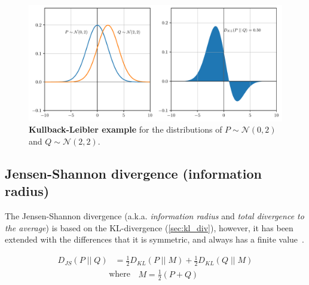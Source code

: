 \begin{figure}[!htp]
    \centering
    \includegraphics[width=0.9\linewidth]{graphics/kullback-leibler.pdf}
    \caption{\textbf{Kullback-Leibler example} for the distributions of
    $P\sim{}\mathcal{N}(0,2)$ and $Q\sim{}\mathcal{N}(2,2)$. }
    \label{fig:kullback-leibler}
\end{figure}

\subsection{Jensen-Shannon divergence (information radius)}

The Jensen-Shannon divergence (a.k.a. \textit{information radius} and
\textit{total divergence to the average}) is based on the KL-divergence
(\autoref{sec:kl_div}), however, it has been extended with the differences that
it is symmetric, and always has a finite value~\cite{Endres2003, Fuglede2004}.


\begin{equation}
    \begin{aligned}
    D_{JS}(P\;||\;Q) &= \frac{1}{2}D_{KL}(P\;||\;M) + \frac{1}{2}D_{KL}(Q\;||\;M)
    \end{aligned}
\end{equation}
\begin{equation*}
    \text{where}\;\;
    \begin{aligned}
        M = \frac{1}{2}(P+Q)
    \end{aligned}
\end{equation*}